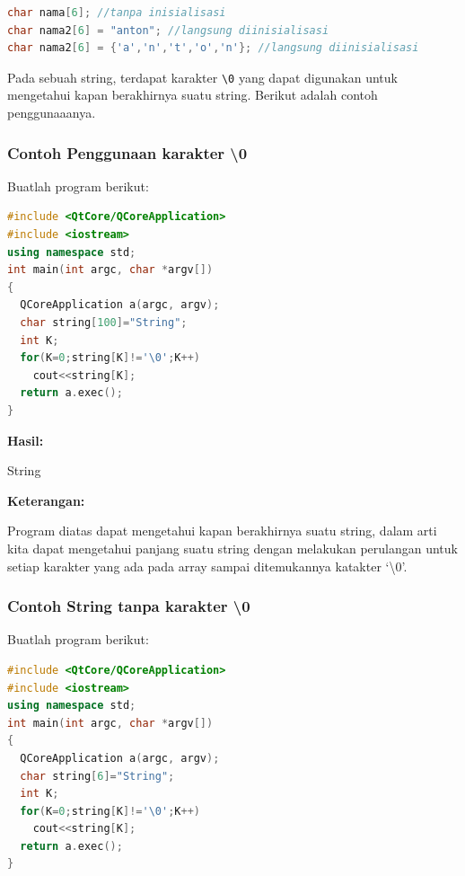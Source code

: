 \begin{lstlisting}[language=c++, numbers=none]
char nama[6]; //tanpa inisialisasi
char nama2[6] = "anton"; //langsung diinisialisasi
char nama2[6] = {'a','n','t','o','n'}; //langsung diinisialisasi
\end{lstlisting}

Pada sebuah string, terdapat karakter \texttt{\textbackslash{}0} yang
dapat digunakan untuk mengetahui kapan berakhirnya suatu string. Berikut
adalah contoh penggunaaanya.

\subsubsection*{Contoh  Penggunaan karakter \textbackslash{0}}

Buatlah program berikut:

\begin{lstlisting}[language=c++, caption=Penggunaan karakter \textbackslash{0}, label=contoh3-15]
#include <QtCore/QCoreApplication>
#include <iostream>
using namespace std;
int main(int argc, char *argv[])
{
  QCoreApplication a(argc, argv);
  char string[100]="String";
  int K;
  for(K=0;string[K]!='\0';K++)
    cout<<string[K];
  return a.exec();
}
\end{lstlisting}

\textbf{Hasil:}

\begin{lcverbatim}
String
\end{lcverbatim}

\textbf{Keterangan:}

Program diatas dapat mengetahui kapan berakhirnya suatu string, dalam
arti kita dapat mengetahui panjang suatu string dengan melakukan
perulangan untuk setiap karakter yang ada pada array sampai ditemukannya
katakter `\textbackslash{}0'.

\subsubsection*{Contoh  String tanpa karakter \textbackslash{0}}

Buatlah program berikut:

\begin{lstlisting}[language=c++, caption=String tanpa karakter \textbackslash{0}, label=contoh3-16]
#include <QtCore/QCoreApplication>
#include <iostream>
using namespace std;
int main(int argc, char *argv[])
{
  QCoreApplication a(argc, argv);
  char string[6]="String";
  int K;
  for(K=0;string[K]!='\0';K++)
    cout<<string[K];
  return a.exec();
}
\end{lstlisting}

